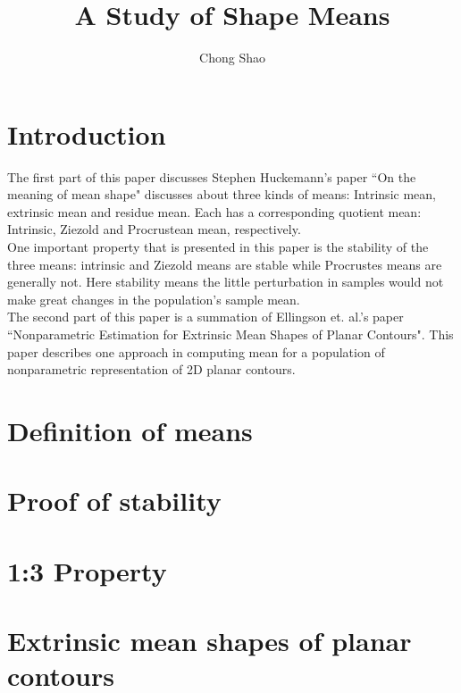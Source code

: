 \documentclass[12pt]{article}
\theoremstyle{definition}
\theoremstyle{remark}
\numberwithin{equation}{section}
\begin{document}
\title{A Study of Shape Means}%
\author{Chong Shao}%

\maketitle
\section{Introduction}
The first part of this paper discusses Stephen Huckemann's paper ``On the meaning of mean shape" discusses about three kinds of means: Intrinsic mean, extrinsic mean and residue mean. Each has a corresponding quotient mean: Intrinsic, Ziezold and Procrustean mean, respectively. \\[0.2cm]
One important property that is presented in this paper is the stability of the three means: intrinsic and Ziezold means are stable while Procrustes means are generally not. Here stability means the little perturbation in samples would not make great changes in the population's sample mean. \\[0.2cm]
The second part of this paper is a summation of Ellingson et. al.'s paper ``Nonparametric Estimation for Extrinsic Mean Shapes of Planar Contours". This paper describes one approach in computing mean for a population of nonparametric representation of 2D planar contours.
\section{Definition of means}
\section{Proof of stability}
\section{1:3 Property}
\section{Extrinsic mean shapes of planar contours}
\end{document}
